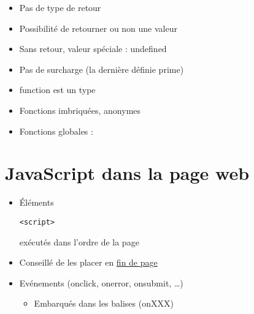 \begin{itemize}
\tightlist
\item
  Pas de type de retour
\item
  Possibilité de retourner ou non une valeur
\item
  Sans retour, valeur spéciale : undefined
\item
  Pas de surcharge (la dernière définie prime)
\item
  function est un type
\item
  Fonctions imbriquées, anonymes
\item
  Fonctions globales :
\end{itemize}

\begin{otherlanguage}{english}

\begin{Shaded}
\begin{Highlighting}[]
\NormalTok{()}\OperatorTok{,} \NormalTok{()}\OperatorTok{,} \NormalTok{()}\OperatorTok{,} \NormalTok{()}\OperatorTok{,}
\NormalTok{()}\OperatorTok{,} \NormalTok{()}\OperatorTok{,} \NormalTok{()}\OperatorTok{,} \NormalTok{()}\OperatorTok{,} 
\NormalTok{()}\OperatorTok{,}
\end{Highlighting}
\end{Shaded}

\end{otherlanguage}

\hypertarget{javascript-dans-la-page-web}{%
\section{JavaScript dans la page
web}\label{javascript-dans-la-page-web}}

\begin{itemize}
\tightlist
\item
  Éléments
  \begin{otherlanguage}{english}\texttt{\textless{}script\textgreater{}}\end{otherlanguage}
  exécutés dans l'ordre de la page
\item
  Conseillé de les placer en
  \href{https://developer.yahoo.com/performance/rules.html\#js_bottom=}{fin
  de page}
\item
  Evénements (onclick, onerror, onsubmit, \ldots{})

  \begin{itemize}
  \tightlist
  \item
    Embarqués dans les balises (onXXX)
  \end{itemize}
\end{itemize}

